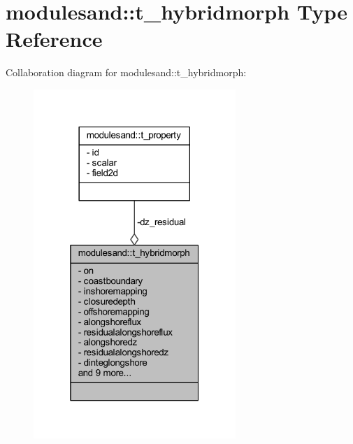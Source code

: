 \hypertarget{structmodulesand_1_1t__hybridmorph}{}\section{modulesand\+:\+:t\+\_\+hybridmorph Type Reference}
\label{structmodulesand_1_1t__hybridmorph}


Collaboration diagram for modulesand\+:\+:t\+\_\+hybridmorph\+:\nopagebreak
\begin{figure}[H]
\begin{center}
\leavevmode
\includegraphics[width=217pt]{structmodulesand_1_1t__hybridmorph__coll__graph}
\end{center}
\end{figure}
